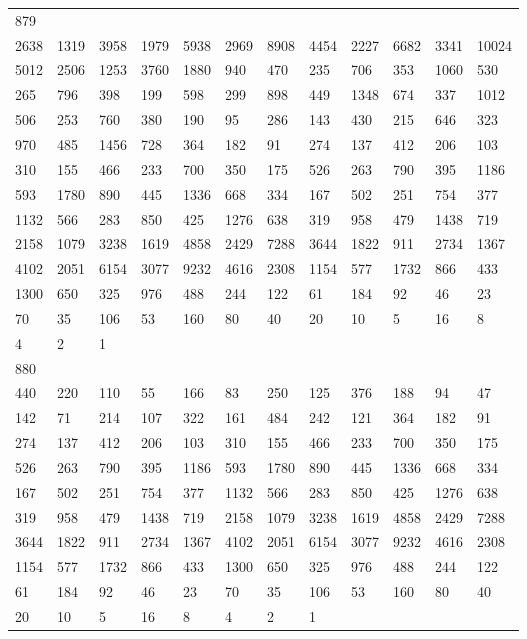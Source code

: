\begin{longtable}{llllllllllll}
879&&&&&&&&&&&\\
2638& 1319& 3958& 1979& 5938& 2969& 8908& 4454& 2227& 6682& 3341& 10024\\
5012& 2506& 1253& 3760& 1880& 940& 470& 235& 706& 353& 1060& 530\\
265& 796& 398& 199& 598& 299& 898& 449& 1348& 674& 337& 1012\\
506& 253& 760& 380& 190& 95& 286& 143& 430& 215& 646& 323\\
970& 485& 1456& 728& 364& 182& 91& 274& 137& 412& 206& 103\\
310& 155& 466& 233& 700& 350& 175& 526& 263& 790& 395& 1186\\
593& 1780& 890& 445& 1336& 668& 334& 167& 502& 251& 754& 377\\
1132& 566& 283& 850& 425& 1276& 638& 319& 958& 479& 1438& 719\\
2158& 1079& 3238& 1619& 4858& 2429& 7288& 3644& 1822& 911& 2734& 1367\\
4102& 2051& 6154& 3077& 9232& 4616& 2308& 1154& 577& 1732& 866& 433\\
1300& 650& 325& 976& 488& 244& 122& 61& 184& 92& 46& 23\\
70& 35& 106& 53& 160& 80& 40& 20& 10& 5& 16& 8\\
4& 2& 1& \\

880&&&&&&&&&&&\\
440& 220& 110& 55& 166& 83& 250& 125& 376& 188& 94& 47\\
142& 71& 214& 107& 322& 161& 484& 242& 121& 364& 182& 91\\
274& 137& 412& 206& 103& 310& 155& 466& 233& 700& 350& 175\\
526& 263& 790& 395& 1186& 593& 1780& 890& 445& 1336& 668& 334\\
167& 502& 251& 754& 377& 1132& 566& 283& 850& 425& 1276& 638\\
319& 958& 479& 1438& 719& 2158& 1079& 3238& 1619& 4858& 2429& 7288\\
3644& 1822& 911& 2734& 1367& 4102& 2051& 6154& 3077& 9232& 4616& 2308\\
1154& 577& 1732& 866& 433& 1300& 650& 325& 976& 488& 244& 122\\
61& 184& 92& 46& 23& 70& 35& 106& 53& 160& 80& 40\\
20& 10& 5& 16& 8& 4& 2& 1& \\


\end{longtable}

